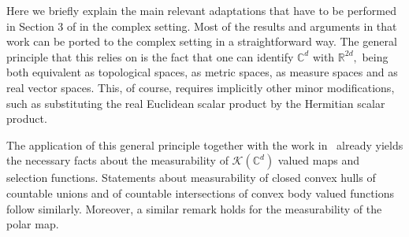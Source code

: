 \documentclass{article}
\theoremstyle{definition}
\theoremstyle{remark}
\numberwithin{equation}{section}
\newcommand{\reals}{\mathbb{R}}
\newcommand{\complex}{\mathbb{C}}
\newcommand{\1}{\mathbf{1}}
\begin{document}
    Here we briefly explain the main relevant adaptations that have to be performed in Section 3 of \cite{Cruz_Uribe_Bownik_Extrapolation} in the complex setting.
    Most of the results and arguments in that work can be ported to the complex setting in a straightforward way.
    The general principle that this relies on is the fact that one can identify $\complex^d$ with $\reals^{2d},$ being both equivalent as topological spaces, as metric spaces, as measure spaces and as real vector spaces.
    This, of course, requires implicitly other minor modifications, such as substituting the real Euclidean scalar product by the Hermitian scalar product.

    The application of this general principle together with the work in~\cite{Cruz_Uribe_Bownik_Extrapolation} already yields the necessary facts about the measurability of $\mathcal{K}(\complex^d)$ valued maps and selection functions.
    Statements about measurability of closed convex hulls of countable unions and of countable intersections of convex body valued functions follow similarly.
    Moreover, a similar remark holds for the measurability of the polar map.
    

    
\end{document}
